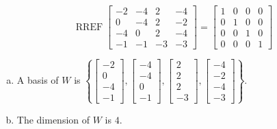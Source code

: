 \begin{exerciseAnswer} 


\[\operatorname{RREF} \left[\begin{array}{cccc}
-2 & -4 & 2 & -4 \\
0 & -4 & 2 & -2 \\
-4 & 0 & 2 & -4 \\
-1 & -1 & -3 & -3
\end{array}\right] = \left[\begin{array}{cccc}
1 & 0 & 0 & 0 \\
0 & 1 & 0 & 0 \\
0 & 0 & 1 & 0 \\
0 & 0 & 0 & 1
\end{array}\right] \]


\begin{enumerate}[(a)]
\item A basis of \(W\) is \( \left\{ \left[\begin{array}{c}
-2 \\
0 \\
-4 \\
-1
\end{array}\right] , \left[\begin{array}{c}
-4 \\
-4 \\
0 \\
-1
\end{array}\right] , \left[\begin{array}{c}
2 \\
2 \\
2 \\
-3
\end{array}\right] , \left[\begin{array}{c}
-4 \\
-2 \\
-4 \\
-3
\end{array}\right] \right\} \).
\item The dimension of \(W\) is \( 4 \).
\end{enumerate}
    
\end{exerciseAnswer}
    

